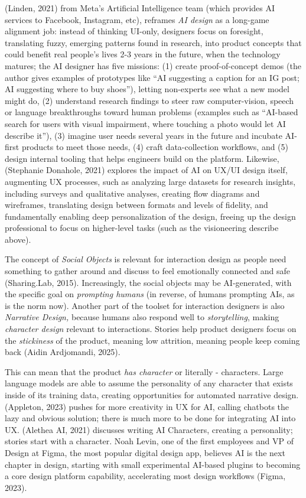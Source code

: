 \documentclass[
  12pt,
  letterpaper,
  DIV=11,
  numbers=noendperiod]{scrartcl}
\begin{document}
(Linden, 2021) from Meta's Artificial Intelligence team (which provides
AI services to Facebook, Instagram, etc), reframes \emph{AI design} as a
long-game alignment job: instead of thinking UI-only, designers focus on
foresight, translating fuzzy, emerging patterns found in research, into
product concepts that could benefit real people's lives 2-3 years in the
future, when the technology matures; the AI designer has five missions:
(1) create proof-of-concept demos (the author gives examples of
prototypes like ``AI suggesting a caption for an IG post; AI suggesting
where to buy shoes''), letting non-experts see what a new model might
do, (2) understand research findings to steer raw computer-vision,
speech or language breakthroughs toward human problems (examples such as
``AI-based search for users with visual impairment, where touching a
photo would let AI describe it''), (3) imagine user needs several years
in the future and incubate AI-first products to meet those needs, (4)
craft data-collection workflows, and (5) design internal tooling that
helps engineers build on the platform. Likewise, (Stephanie Donahole,
2021) explores the impact of AI on UX/UI design itself, augmenting UX
processes, such as analyzing large datasets for research insights,
including surveys and qualitative analyses, creating flow diagrams and
wireframes, translating design between formats and levels of fidelity,
and fundamentally enabling deep personalization of the design, freeing
up the design professional to focus on higher-level tasks (such as the
visioneering describe above).

The concept of \emph{Social Objects} is relevant for interaction design
as people need something to gather around and discuss to feel
emotionally connected and safe (Sharing.Lab, 2015). Increasingly, the
social objects may be AI-generated, with the specific goal on
\emph{prompting humans} (in reverse, of humans prompting AIs, as is the
norm now). Another part of the toolset for interaction designers is also
\emph{Narrative Design,} because humans also respond well to
\emph{storytelling}, making \emph{character design} relevant to
interactions. Stories help product designers focus on the
\emph{stickiness} of the product, meaning low attrition, meaning people
keep coming back (Aidin Ardjomandi, 2025).

This can mean that the product \emph{has character} or literally -
characters. Large language models are able to assume the personality of
any character that exists inside of its training data, creating
opportunities for automated narrative design. (Appleton, 2023) pushes
for more creativity in UX for AI, calling chatbots the lazy and obvious
solution; there is much more to be done for integrating AI into UX.
(Alethea AI, 2021) discusses writing AI Characters, creating a
personality; stories start with a character. Noah Levin, one of the
first employees and VP of Design at Figma, the most popular digital
design app, believes AI is the next chapter in design, starting with
small experimental AI-based plugins to becoming a core design platform
capability, accelerating most design workflows (Figma, 2023).
\end{document}
